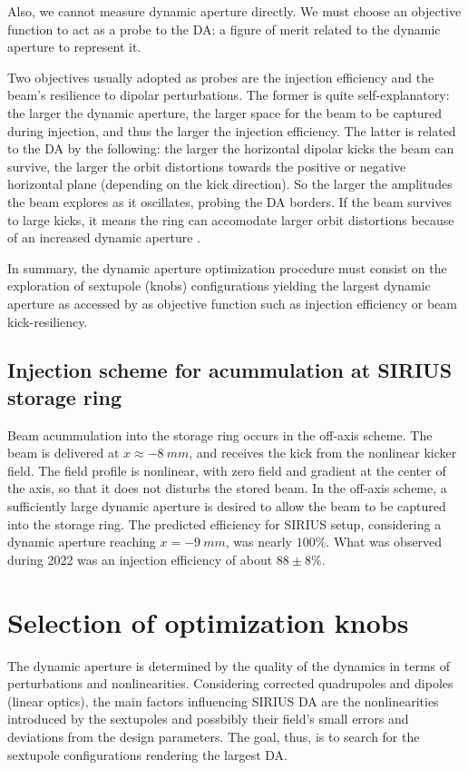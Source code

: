 Also, we cannot measure dynamic aperture directly. We must choose an objective function to act as a probe to the DA: a figure of merit related to the dynamic aperture to represent it.

Two objectives usually adopted as probes are the injection efficiency and the beam's resilience to dipolar perturbations. The former is quite self-explanatory: the larger the dynamic aperture, the larger space for the beam to be captured during injection, and thus the larger the injection efficiency. The latter is related to the DA by the following: the larger the horizontal dipolar kicks the beam can survive, the larger the orbit distortions towards the positive or negative horizontal plane (depending on the kick direction). So the larger the amplitudes the beam explores as it oscillates, probing the DA borders. If the beam survives to large kicks, it means the ring can accomodate larger orbit distortions because of an increased dynamic aperture
.

In summary, the dynamic aperture optimization procedure must consist on the exploration of sextupole (knobs) configurations yielding the largest dynamic aperture as accessed by as objective function such as injection efficiency or beam kick-resiliency.

\subsection{Injection scheme for acummulation at SIRIUS storage ring}
Beam acummulation into the storage ring occurs in the off-axis scheme. The beam is delivered at $x\approx-8~\unit{mm}$, and receives the kick from the nonlinear kicker field. The field profile is nonlinear, with zero field and gradient at the center of the axis, so that it does not disturbs the stored beam.
In the off-axis scheme, a sufficiently large dynamic aperture is desired to allow the beam to be captured into the storage ring. The predicted efficiency for SIRIUS setup, considering a dynamic aperture reaching $x=-9~\unit{mm}$, was nearly $100\%$. What was observed during 2022 was an injection efficiency of about $88\pm8\%$.

\section{Selection of optimization knobs}

The dynamic aperture is determined by the quality of the dynamics in terms of perturbations and nonlinearities. Considering corrected quadrupoles and dipoles (linear optics), the main factors influencing SIRIUS DA are the nonlinearities introduced by the sextupoles and possbibly their field's small errors and deviations from the design parameters. The goal, thus, is to search for the sextupole configurations rendering the largest DA.

